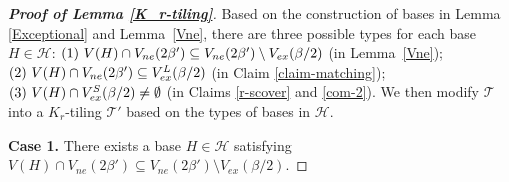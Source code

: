 \documentclass[11pt, a4paper]{article}
\theoremstyle{definition}
\newcommand{\<}{\subseteq}
\begin{document}
\begin{proof}[\bf Proof of Lemma \ref{K_r-tiling}]


Based on the construction of bases in Lemma \ref{Exceptional} and Lemma~\ref{Vne}, there are three possible  types for each base  $H\in \mathcal{H}$: 
${\rm (1)}\ V(H)\cap V_{ne}(2\beta')\subseteq V_{ne}(2\beta')\setminus V_{ex}(\beta/2)$ (in Lemma~\ref{Vne}); ${\rm (2)}\ V(H)\cap V_{ne}(2\beta')\subseteq V_{ex}^L(\beta/2)$ (in Claim \ref{claim-matching}); ${\rm (3)}\ V(H)\cap V_{ex}^S(\beta/2)\ne \emptyset$ (in Claims \ref{r-scover} and \ref{com-2}). We then modify $\mathcal{T}$ into a $K_r$-tiling $\mathcal{T}'$ based on the types of bases in $\mathcal{H}$. %

\medskip
\textbf{Case 1.} There exists a base $H\in \mathcal{H}$ satisfying $V(H)\cap V_{ne}(2\beta')\subseteq V_{ne}(2\beta')\setminus V_{ex}(\beta/2).$
\medskip


\end{proof}
\end{document}
